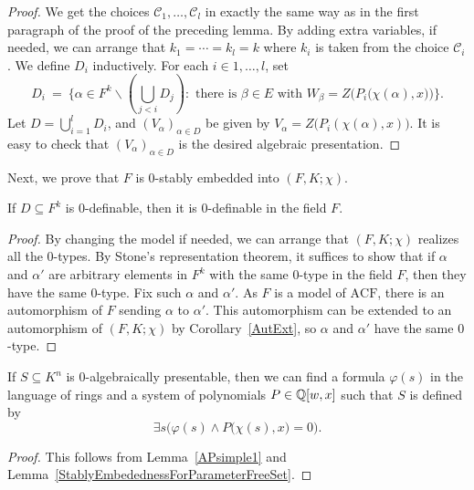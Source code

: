 \begin{proof}
We get the choices $\mathscr{C}_1, \ldots, \mathscr{C}_l$ in exactly the same way as in the first paragraph of the proof of the preceding lemma.
By adding extra variables, if needed, we can arrange that $k_1 = \cdots = k_l = k$ where $k_i$ is taken from the choice $\mathscr{C}_i$. We define $D_i$ inductively. For each $i \in { 1,\ldots, l} $, set
$$D_i \ =\  \bigg\{ \alpha \in F^k \backslash ( \bigcup_{j<i} D_j): \text{ there is } \beta \in E \text{ with } W_\beta = Z\Big( P_i\big(\chi(\alpha),x\big)\Big) \bigg \}.$$
Let $D = \bigcup_{i=1}^l D_i$, and $(V_\alpha)_{ \alpha \in D} $ be given by $V_\alpha = Z \big( P_i(\chi(\alpha),x)\big)$. It is easy to check that $(V_\alpha)_{ \alpha \in D}$ is the desired algebraic presentation.
\end{proof}

\noindent
Next, we prove that $F$ is $0$-stably embedded into $(F, K; \chi)$.
\begin{lem}\label{StablyEmbedednessForParameterFreeSet}
If $ D \subseteq F^k$ is $0$-definable, then it is $0$-definable in the field $F$.
\end{lem}

\begin{proof}
By changing the model if needed, we can arrange that $ (F, K; \chi) $ realizes all the $0$-types. By Stone's representation theorem, it suffices to show that if $ \alpha $ and $\alpha'$ are arbitrary elements in $ F^k$ with the same $0$-type in the field $F$, then they have the same $0$-type. Fix such $\alpha$ and $\alpha'$. As  $F$ is a model of $ \text{ACF} $, there is an automorphism of $F$ sending $ \alpha $ to $ \alpha'$. This automorphism can be extended to an automorphism of $(F, K;\chi) $ by Corollary~\ref{AutExt}, so $ \alpha $ and $ \alpha'$ have the same  $0$-type. 
\end{proof}

\begin{prop}
If $S\subseteq K^n$ is $0$-algebraically presentable, then we can find a formula $\varphi(s)$ in the language of rings and a system of polynomials $P \in \mathbb{Q}[w,x]$ such that $S$ is defined by 
$$ \exists s \Big(\varphi(s)\wedge P\big(\chi(s),x\big)=0 \Big).$$
\end{prop}

\begin{proof}
This follows from Lemma~\ref{APsimple1} and Lemma~\ref{StablyEmbedednessForParameterFreeSet}.
\end{proof}

